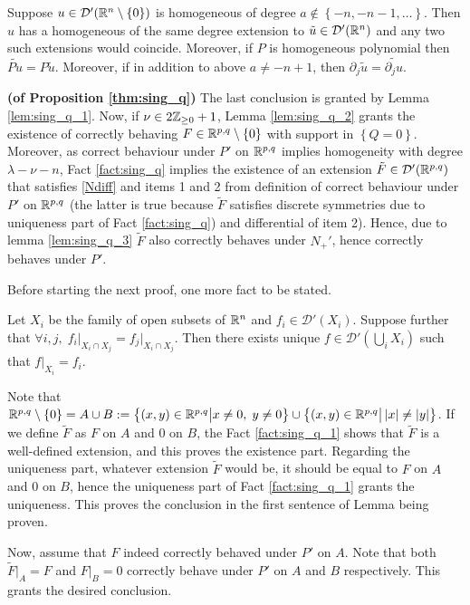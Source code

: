 \documentclass[10pt]{article} %
\newcommand{\D}{\mathcal{D}}
\theoremstyle{definition}
\theoremstyle{remark}
\begin{document}
\begin{myfact}{\bf\cite[thm 3.2.3]{hormander1983analysis}}\newline
	Suppose $u\in\D'(\R^n\setminus\left\{ 0 \right\})$ is homogeneous of degree $a\notin\left\{ -n,-n-1,\dots \right\}$.
	Then $u$ has a homogeneous of the same degree extension to $\tilde{u}\in\D'(\R^n)$ and any two such extensions would coincide.
	Moreover, if $P$ is homogeneous polynomial then $\tilde{Pu}=P\tilde{u}$. Moreover, if in addition to above $a\neq -n+1$,
	then $\partial_j\tilde{u}=\tilde{\partial_ju}$.
	\label{fact:sing_q}
\end{myfact}
\begin{myproof}{\bf (of Proposition \ref{thm:sing_q})}\newline
	The last conclusion is granted by Lemma \ref{lem:sing_q_1}. Now, if $\nu\in2\mathbb{Z}_{\geq0}+1$, Lemma \ref{lem:sing_q_2}
	grants the existence of correctly behaving $F\in\mathbb{R}^{p,q}\setminus\left\{ 0 \right\}$ with support in $\left\{ Q=0 \right\}$.
	Moreover, as correct behaviour under $P'$ on $\mathbb{R}^{p,q}$ implies homogeneity with degree $\lambda-\nu-n$, Fact 
	\ref{fact:sing_q}
	implies the existence of an extension $\tilde{F}\in\D'(\R^{p,q})$ that satisfies \eqref{Ndiff} and items 1 and 2
	from definition of correct behaviour under $P'$ on $\mathbb{R}^{p,q}$ (the latter is true because $\tilde{F}$ satisfies
	discrete symmetries due to uniqueness part of Fact \ref{fact:sing_q}) and differential of item 2).
	Hence, due to lemma \ref{lem:sing_q_3} $\tilde{F}$ also correctly behaves under $N_+'$, hence correctly behaves
	under $P'$.
\end{myproof}
Before starting the next proof, one more fact to be stated.
\begin{myfact}
	Let $X_i$ be the family of open subsets of $\mathbb{R}^n$ and $f_i\in\D'(X_i)$. Suppose further
	that $\forall i,j,\;f_i\Big|_{X_i\cap X_j}=f_j\Big|_{X_i\cap X_j}$. Then there exists unique
	$f\in\D'(\bigcup_iX_i)$ such that $f\Big|_{X_i}=f_i$.
	\label{fact:sing_q_1}
\end{myfact}
\begin{myproof}
	Note that $\mathbb{R}^{p,q}\setminus\left\{ 0 \right\}=A\cup B:
	=\left\{(x,y)\in\mathbb{R}^{p,q}\big| x\neq0,\;y\neq0\right\}\cup\left\{(x,y)\in\mathbb{R}^{p,q}\big| \left|x\right|\neq\left|y\right|\right\}$. If we define $\tilde{F}$ as $F$ on $A$ and 0 on $B$, the Fact \ref{fact:sing_q_1}
	shows that $\tilde{F}$ is a well-defined extension, and this proves the existence part. Regarding the uniqueness part,
	whatever extension $\tilde{F}$ would be, it should be equal to $F$ on $A$ and 0 on $B$, hence the uniqueness part 
	of Fact \ref{fact:sing_q_1} grants the uniqueness. This proves the conclusion in the first sentence of Lemma being proven.

	Now, assume that $F$ indeed correctly behaved under $P'$ on $A$. Note that both $\tilde{F}\Big|_A=F$ and
	$F\Big|_B=0$ correctly behave under $P'$ on $A$ and $B$ respectively. This grants the desired conclusion.
\end{myproof}
\end{document}
